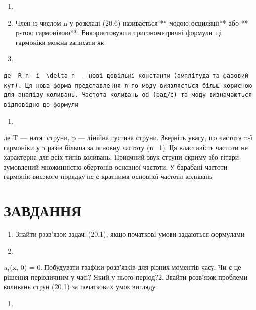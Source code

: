 \documentclass[
  ukrainian,
]{article}
\providecommand{\tightlist}{%
  \setlength{\itemsep}{0pt}\setlength{\parskip}{0pt}}
\begin{document}
\begin{enumerate}
\def\labelenumi{\arabic{enumi}.}
\setcounter{enumi}{17}
\item
\item
  Член із числом n у розкладі (20.6) називається ** модою осциляції**
  або ** p-тою гармонікою**. Використовуючи тригонометричні формули, ці
  гармоніки можна записати як
\item
\end{enumerate}

\begin{verbatim}
де  R_n  і  \delta_n  — нові довільні константи (амплітуда та фазовий кут). Ця нова форма представлення n-го моду виявляється більш корисною для аналізу коливань. Частота коливань od (рад/с) та моду визначаються відповідно до формули
\end{verbatim}

\begin{enumerate}
\def\labelenumi{\arabic{enumi}.}
\setcounter{enumi}{9}
\tightlist
\item
\end{enumerate}

де T --- натяг струни, p --- лінійна густина струни. Зверніть увагу, що
частота n-ї гармоніки у n разів більша за основну частоту (n=1). Ця
властивість частоти не характерна для всіх типів коливань. Приємний звук
струни скриму або гітари зумовлений множинністю обертонів основної
частоти. У барабані частоти гармонік високого порядку не є кратними
основної частоти коливань.

\section{ЗАВДАННЯ}\label{ux437ux430ux432ux434ux430ux43dux43dux44f}

\begin{enumerate}
\def\labelenumi{\arabic{enumi}.}
\item
  Знайти розв'язок задачі (20.1), якщо початкові умови задаються
  формулами
\item
\end{enumerate}

\(u_t\)(x, 0) = 0. Побудувати графіки розв'язків для різних моментів
часу. Чи є це рішення періодичним у часі? Який у нього період?2. Знайти
розв'язок проблеми коливань струн (20.1) за початкових умов вигляду

\begin{enumerate}
\def\labelenumi{\arabic{enumi}.}
\setcounter{enumi}{10}
\tightlist
\item
\end{enumerate}
\end{document}
